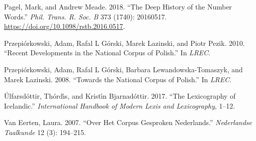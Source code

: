\documentclass[]{article}
\begin{document}
\leavevmode\hypertarget{ref-pagel_deep_2018}{}%
Pagel, Mark, and Andrew Meade. 2018. ``The Deep History of the Number
Words.'' \emph{Phil. Trans. R. Soc. B} 373 (1740): 20160517.
\url{https://doi.org/10.1098/rstb.2016.0517}.

\leavevmode\hypertarget{ref-przepiorkowski2010recent}{}%
Przepiórkowski, Adam, Rafal L Górski, Marek Lazinski, and Piotr Pezik.
2010. ``Recent Developments in the National Corpus of Polish.'' In
\emph{LREC}.

\leavevmode\hypertarget{ref-przepiorkowski2008towards}{}%
Przepiórkowski, Adam, Rafal L Górski, Barbara Lewandowska-Tomaszyk, and
Marek Lazinski. 2008. ``Towards the National Corpus of Polish.'' In
\emph{LREC}.

\leavevmode\hypertarget{ref-ulfarsdottir2017lexicography}{}%
Úlfarsdóttir, Thórdı́s, and Kristı́n Bjarnadóttir. 2017. ``The
Lexicography of Icelandic.'' \emph{International Handbook of Modern
Lexis and Lexicography}, 1--12.

\leavevmode\hypertarget{ref-van2007over}{}%
Van Eerten, Laura. 2007. ``Over Het Corpus Gesproken Nederlands.''
\emph{Nederlandse Taalkunde} 12 (3): 194--215.
\end{document}
